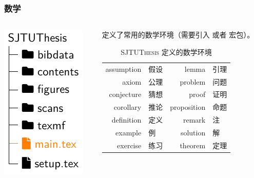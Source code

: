 \begin{frame}
  \frametitle{数学}
  \begin{columns}
    \begin{column}{0.4\textwidth}
      \includegraphics[page=5]{support/figures/thesisdir.pdf}
    \end{column}
    \begin{column}{0.6\textwidth}
      \SJTUThesis{} 定义了常用的数学环境（需要引入  或者  宏包）。

      \begin{table}
        \centering
        \caption{\textsc{SJTUThesis} 定义的数学环境}
        \footnotesize
        \begin{tabular}{>{\ttfamily}rl|>{\ttfamily}rl}
          \toprule
          assumption  & 假设  & lemma       & 引理 \\
          axiom       & 公理  & problem     & 问题 \\
          conjecture  & 猜想  & proof       & 证明 \\
          corollary   & 推论  & proposition & 命题 \\
          definition  & 定义  & remark      & 注   \\
          example     & 例    & solution    & 解   \\
          exercise    & 练习  & theorem     & 定理 \\
          \bottomrule
        \end{tabular}
      \end{table}
    \end{column}
  \end{columns}
\end{frame}

